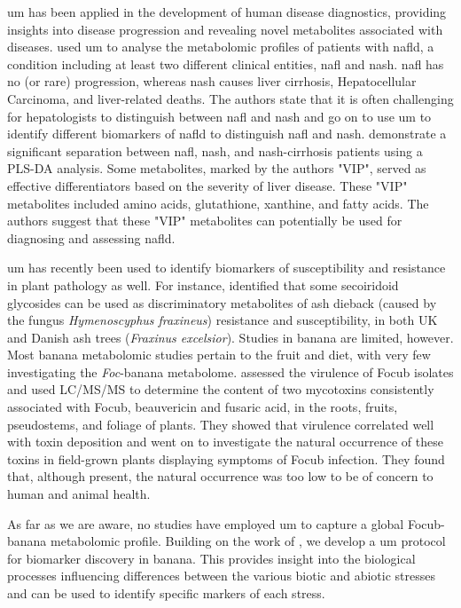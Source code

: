 \ac{um} has been  applied in the development of human disease diagnostics, providing insights into disease progression and revealing novel metabolites associated with diseases. \textcite{Masarone2021} used \ac{um} to analyse the metabolomic profiles of patients with \ac{nafld}, a condition including at least two different clinical entities, \ac{nafl} and \ac{nash}. \ac{nafl} has no (or rare) progression, whereas \ac{nash} causes liver cirrhosis, Hepatocellular Carcinoma, and liver-related deaths. The authors state that it is often challenging for hepatologists to distinguish between \ac{nafl} and \ac{nash} and go on to use \ac{um} to identify different biomarkers of \ac{nafld} to distinguish \ac{nafl} and \ac{nash}. \textcite{Masarone2021} demonstrate a significant separation between \ac{nafl}, \ac{nash}, and \ac{nash}-cirrhosis patients using a PLS-DA analysis. Some metabolites, marked by the authors "VIP", served as effective differentiators based on the severity of liver disease. These "VIP" metabolites included amino acids, glutathione, xanthine, and fatty acids. The authors suggest that these "VIP" metabolites can potentially be used for diagnosing and assessing \ac{nafld}.

\ac{um} has recently been used to identify biomarkers of susceptibility and resistance in plant pathology as well. For instance, \textcite{Sambles2017, Sidda2020} identified that some secoiridoid glycosides can be used as discriminatory metabolites of ash dieback  (caused by the fungus \textit{Hymenoscyphus fraxineus}) resistance and susceptibility,  in both UK and Danish ash trees (\textit{Fraxinus excelsior}). Studies in banana are limited, however. Most banana metabolomic studies pertain to the fruit and diet, with very few investigating the \textit{Foc}-banana metabolome. \parencite{Li2013c} assessed the virulence of \ac{Focub} isolates and used LC/MS/MS to determine the content of two mycotoxins consistently associated with \ac{Focub}, beauvericin and fusaric acid, in the roots, fruits, pseudostems, and foliage of plants. They showed that virulence correlated well with toxin deposition and went on to investigate the natural occurrence of these toxins in field-grown plants displaying symptoms of \ac{Focub} infection. They found that, although present, the natural occurrence was too low to be of concern to human and animal health.

As far as we are aware, no studies have employed \ac{um} to capture a global \ac{Focub}-banana metabolomic profile. Building on the work of \textcite{Sambles2017, Sidda2020}, we develop a \ac{um} protocol for biomarker discovery in banana. This provides insight into the biological processes influencing differences between the various biotic and abiotic stresses  and can be used to identify specific markers of each stress.

